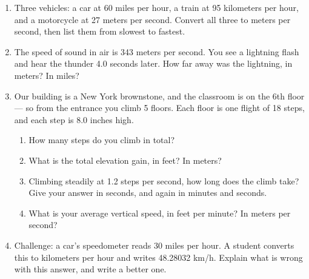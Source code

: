 \documentclass[12pt, twoside]{article}
\begin{document}
\begin{enumerate}[itemsep=0.4cm]
\newpage

\item Three vehicles: a car at 60 miles per hour, a train at 95 kilometers per hour, and a motorcycle at 27 meters per second. Convert all three to meters per second, then list them from slowest to fastest.

\vspace{3.0cm}

\item The speed of sound in air is 343 meters per second. You see a lightning flash and hear the thunder 4.0 seconds later. How far away was the lightning, in meters? In miles?

\vspace{2.8cm}

\item Our building is a New York brownstone, and the classroom is on the 6th floor --- so from the entrance you climb 5 floors. Each floor is one flight of 18 steps, and each step is 8.0 inches high.
  \begin{enumerate}[itemsep=1.15cm]
    \item How many steps do you climb in total?
    \item What is the total elevation gain, in feet? In meters?
    \item Climbing steadily at 1.2 steps per second, how long does the climb take? Give your answer in seconds, and again in minutes and seconds.
    \item What is your average vertical speed, in feet per minute? In meters per second?
  \end{enumerate} \vspace{0.8cm}

\item Challenge: a car's speedometer reads 30 miles per hour. A student converts this to kilometers per hour and writes 48.28032 km/h. Explain what is wrong with this answer, and write a better one.

\vspace{1.6cm}

\end{enumerate}
\end{document}
